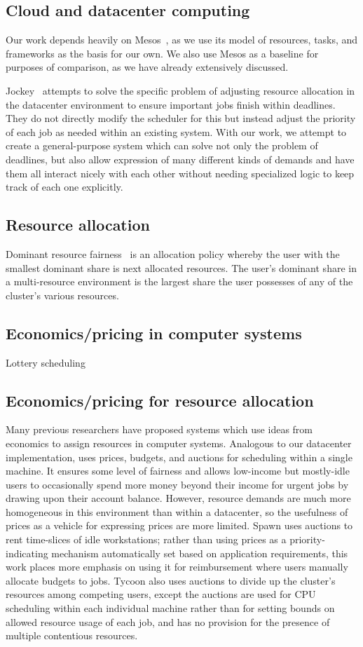 \documentclass{acm_proc_article-sp}
\begin{document}
\subsection{Cloud and datacenter computing}
Our work depends heavily on Mesos~\cite{mesos}, as we use its model of
resources, tasks, and frameworks as the basis for our own. We also use Mesos as
a baseline for purposes of comparison, as we have already extensively discussed.

Jockey~\cite{jockey} attempts to solve the specific problem of adjusting
resource allocation in the datacenter environment to ensure important jobs
finish within deadlines. They do not directly modify the scheduler for this but
instead adjust the priority of each job as needed within an existing system.
With our work, we attempt to create a general-purpose system which can solve not
only the problem of deadlines, but also allow expression of many different kinds
of demands and have them all interact nicely with each other without needing
specialized logic to keep track of each one explicitly.

\subsection{Resource allocation}
Dominant resource fairness~\cite{drf} is an allocation policy whereby the user with the smallest dominant share is next allocated resources. The user's dominant share in a multi-resource environment is the largest share the user possesses of any of the cluster's various resources.

\subsection{Economics/pricing in computer systems}
Lottery scheduling

\subsection{Economics/pricing for resource allocation}
Many previous researchers have proposed systems which use ideas from economics
to assign resources in computer systems.  Analogous to our datacenter
implementation, \cite{stoica94} uses prices, budgets, and auctions for
scheduling within a single machine. It ensures some level of fairness and
allows low-income but mostly-idle users to occasionally spend more money beyond
their income for urgent jobs by drawing upon their account balance. However,
resource demands are much more homogeneous in this environment than within a
datacenter, so the usefulness of prices as a vehicle for expressing prices are
more limited. Spawn \cite{spawn} uses auctions to rent time-slices of idle
workstations; rather than using prices as a priority-indicating mechanism
automatically set based on application requirements, this work places more
emphasis on using it for reimbursement where users manually allocate budgets to
jobs. Tycoon \cite{tycoon} also uses auctions to divide up the cluster's
resources among competing users, except the auctions are used for CPU scheduling
within each individual machine rather than for setting bounds on allowed
resource usage of each job, and has no provision for the presence of
multiple contentious resources.
\end{document}
